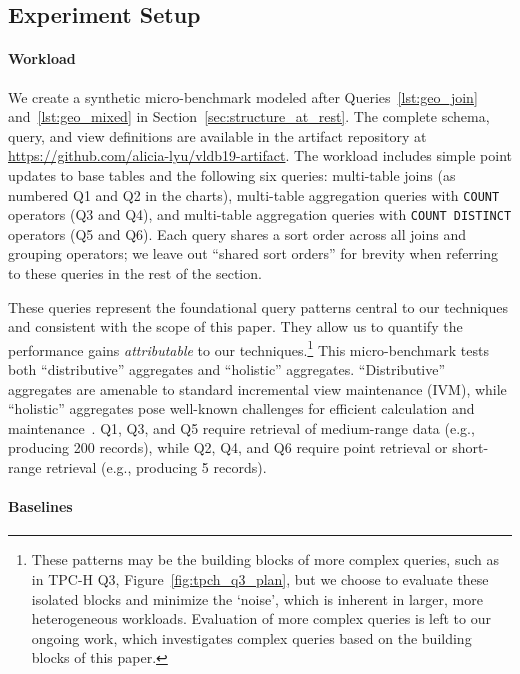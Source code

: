 \documentclass[sigconf, pdfa, nonacm]{acmart}
\newcommand\vldbavailabilityurl{https://github.com/alicia-lyu/vldb19-artifact}
\begin{document}
\subsection{Experiment Setup}\label{subsec:setup}

\paragraph{Workload}

We create a synthetic micro-benchmark modeled after Queries~\ref{lst:geo_join} and~\ref{lst:geo_mixed} in Section~\ref{sec:structure_at_rest}.
The complete schema, query, and view definitions are available in the artifact repository at \url{\vldbavailabilityurl}.
The workload includes simple point updates to base tables and the following six queries: multi-table joins (as numbered Q1 and Q2 in the charts), multi-table aggregation queries with \texttt{COUNT} operators (Q3 and Q4), and multi-table aggregation queries with \texttt{COUNT DISTINCT} operators (Q5 and Q6). Each query shares a sort order across all joins and grouping operators; we leave out ``shared sort orders'' for brevity when referring to these queries in the rest of the section.

These queries represent the foundational query patterns central to our techniques and consistent with the scope of this paper.
They allow us to quantify the performance gains \textit{attributable} to our techniques.\footnote{These patterns may be the building blocks of more complex queries, such as in TPC-H Q3, Figure~\ref{fig:tpch_q3_plan}, but we choose to evaluate these isolated blocks and minimize the `noise', which is inherent in larger, more heterogeneous workloads. Evaluation of more complex queries is left to our ongoing work, which investigates complex queries based on the building blocks of this paper.
}
This micro-benchmark tests both ``distributive'' aggregates and ``holistic'' aggregates. ``Distributive'' aggregates are amenable to standard incremental view maintenance (IVM), while ``holistic'' aggregates pose well-known challenges for efficient calculation and maintenance~\cite{gray1996data}.
Q1, Q3, and Q5 require retrieval of medium-range data (e.g., producing 200 records), while Q2, Q4, and Q6 require point retrieval or short-range retrieval (e.g., producing 5 records).

\paragraph{Baselines}
\end{document}
